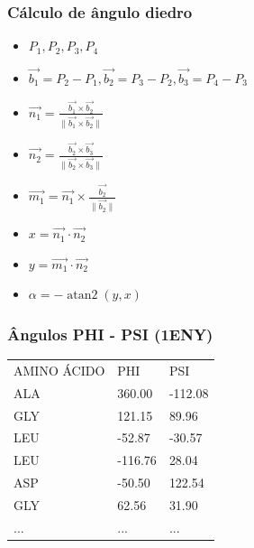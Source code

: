 \documentclass{beamer}
\DeclareMathOperator{\atantwo}{atan2}
\begin{document}
\begin{frame}
\frametitle{Cálculo de ângulo diedro}

\begin{itemize}
 \item $P_{1}, P_{2}, P_{3}, P_{4}$
 \item $\vec{b_{1}} = P_{2} - P_{1}, \vec{b_{2}} = P_{3} - P_{2}, \vec{b_{3}} = P_{4} - P_{3}$
 \item $\vec{n_{1}} = \frac{\vec{b_{1}} \times \vec{b_{2}}}{\parallel \vec{b_{1}} \times \vec{b_{2}} \parallel}$
 \item $\vec{n_{2}} = \frac{\vec{b_{2}} \times \vec{b_{3}}}{\parallel \vec{b_{2}} \times \vec{b_{3}} \parallel}$
 \item $\vec{m_{1}} = \vec{n_{1}} \times \frac{\vec{b_{2}}}{\parallel \vec{b_{2}} \parallel}$
 \item $x = \vec{n_{1}} \cdot \vec{n_{2}}$
 \item $y = \vec{m_{1}} \cdot \vec{n_{2}}$
 \item $\alpha = - \atantwo(y, x)$
\end{itemize}


\end{frame}

\begin{frame}
\frametitle{Ângulos PHI - PSI (1ENY)}
\begin{table}[]
\centering
\label{my-label}
\begin{tabular}{lll}
AMINO ÁCIDO &  PHI     &  PSI    \\
ALA         &  360.00  & -112.08 \\
GLY         &  121.15  &  89.96  \\
LEU         & -52.87   & -30.57  \\
LEU         & -116.76  &  28.04  \\
ASP         & -50.50   &  122.54 \\
GLY         &  62.56   &  31.90  \\
...         & ...      & ...     
\end{tabular}
\end{table}
\end{frame}
\end{document}
